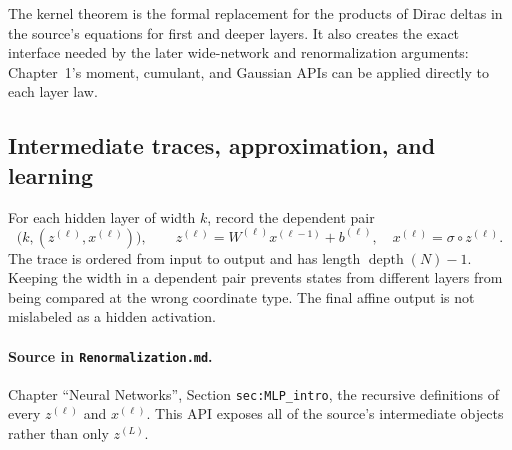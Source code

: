 The kernel theorem is the formal replacement for the products of Dirac deltas in the source's
equations for first and deeper layers.  It also creates the exact interface needed by the later
wide-network and renormalization arguments: Chapter~1's moment, cumulant, and Gaussian APIs can be
applied directly to each layer law.

\subsection{Intermediate traces, approximation, and learning}

\begin{definition}
\label{def:renorm:hiddenLayerTrace}
For each hidden layer of width $k$, record the dependent pair
\[
  \bigl(k,(z^{(\ell)},x^{(\ell)})\bigr),\qquad
  z^{(\ell)}=W^{(\ell)}x^{(\ell-1)}+b^{(\ell)},\quad
  x^{(\ell)}=\sigma\circ z^{(\ell)}.
\]
The trace is ordered from input to output and has length $\operatorname{depth}(N)-1$.  Keeping the
width in a dependent pair prevents states from different layers from being compared at the wrong
coordinate type.  The final affine output is not mislabeled as a hidden activation.

\paragraph{Source in \texttt{Renormalization.md}.}
Chapter ``Neural Networks'', Section \texttt{sec:MLP\_intro}, the recursive definitions of every
$z^{(\ell)}$ and $x^{(\ell)}$.  This API exposes all of the source's intermediate objects rather
than only $z^{(L)}$.
\end{definition}

